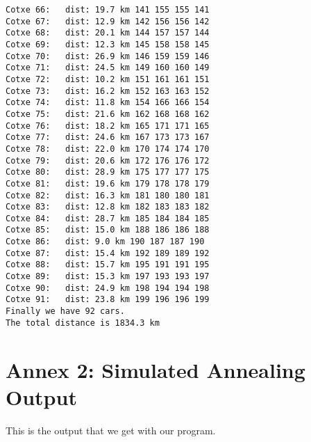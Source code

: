 \documentclass[12]{article}
\begin{document}
\begin{lstlisting}[frame=single]
Cotxe 66:	dist: 19.7 km 141 155 155 141
Cotxe 67:	dist: 12.9 km 142 156 156 142
Cotxe 68:	dist: 20.1 km 144 157 157 144
Cotxe 69:	dist: 12.3 km 145 158 158 145
Cotxe 70:	dist: 26.9 km 146 159 159 146
Cotxe 71:	dist: 24.5 km 149 160 160 149
Cotxe 72:	dist: 10.2 km 151 161 161 151
Cotxe 73:	dist: 16.2 km 152 163 163 152
Cotxe 74:	dist: 11.8 km 154 166 166 154
Cotxe 75:	dist: 21.6 km 162 168 168 162
Cotxe 76:	dist: 18.2 km 165 171 171 165
Cotxe 77:	dist: 24.6 km 167 173 173 167
Cotxe 78:	dist: 22.0 km 170 174 174 170
Cotxe 79:	dist: 20.6 km 172 176 176 172
Cotxe 80:	dist: 28.9 km 175 177 177 175
Cotxe 81:	dist: 19.6 km 179 178 178 179
Cotxe 82:	dist: 16.3 km 181 180 180 181
Cotxe 83:	dist: 12.8 km 182 183 183 182
Cotxe 84:	dist: 28.7 km 185 184 184 185
Cotxe 85:	dist: 15.0 km 188 186 186 188
Cotxe 86:	dist: 9.0 km 190 187 187 190
Cotxe 87:	dist: 15.4 km 192 189 189 192
Cotxe 88:	dist: 15.7 km 195 191 191 195
Cotxe 89:	dist: 15.3 km 197 193 193 197
Cotxe 90:	dist: 24.9 km 198 194 194 198
Cotxe 91:	dist: 23.8 km 199 196 196 199
Finally we have 92 cars.
The total distance is 1834.3 km
\end{lstlisting}

\section{Annex 2: Simulated Annealing Output}

This is the output that we get with our program.
\end{document}
